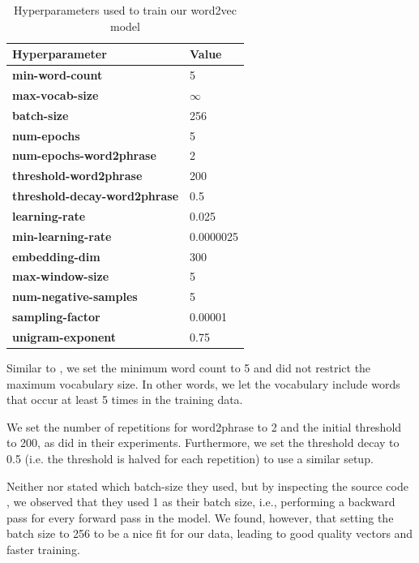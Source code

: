 \begin{table}[ht]
    \centering
    \begin{tabular}{@{}ll@{}}
    \toprule
    Hyperparameter & Value\\
    \midrule
    \trcolor \textbf{min-word-count} & 5\\
    \textbf{max-vocab-size} & $\infty$ \\
    \trcolor \textbf{batch-size} & 256\\
    \textbf{num-epochs} & 5\\
    \trcolor \textbf{num-epochs-word2phrase} & 2\\
    \textbf{threshold-word2phrase} & 200\\
    \trcolor \textbf{threshold-decay-word2phrase} & 0.5\\
    \textbf{learning-rate} & 0.025\\
    \trcolor \textbf{min-learning-rate} & 0.0000025\\
    \textbf{embedding-dim} & 300\\
    \trcolor \textbf{max-window-size} & 5\\
    \textbf{num-negative-samples} & 5\\
    \trcolor \textbf{sampling-factor} & 0.00001\\
    \textbf{unigram-exponent} & 0.75\\
    \bottomrule
    \end{tabular}
    \caption{Hyperparameters used to train our word2vec model}
    \label{table:word2vec-hyperparameter-choices}
\end{table}

Similar to \cite{mikolov2013b}, we set the minimum word count to 5 and did not restrict the maximum vocabulary size. In other words, we let the vocabulary include words that occur at least 5 times in the training data.

We set the number of repetitions for word2phrase to 2 and the initial threshold to 200, as \cite{mikolov2013b} did in their experiments. Furthermore, we set the threshold decay to 0.5 (i.e. the threshold is halved for each repetition) to use a similar setup.

Neither \cite{mikolov2013a} nor \cite{mikolov2013b} stated which batch-size they used, but by inspecting the source code \cite[line 542]{Word2vecCCode}, we observed that they used 1 as their batch size, i.e., performing a backward pass for every forward pass in the model. We found, however, that setting the batch size to 256 to be a nice fit for our data, leading to good quality vectors and faster training.

